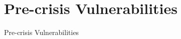 \section{Pre-crisis Vulnerabilities}

\begin{frame}

\begin{center}
{\LARGE Pre-crisis Vulnerabilities}
\end{center}

\end{frame}



